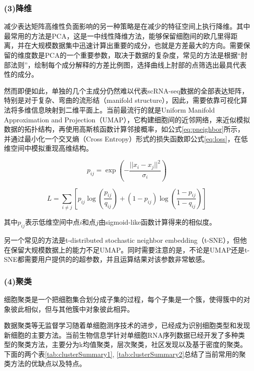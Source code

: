 \subsubsection{(3)降维}

减少表达矩阵高维性负面影响的另一种策略是在减少的特征空间上执行降维。其中最常用的方法是PCA，这是一中线性降维方法，能够保留细胞间的欧几里得距离，并在大规模数据集中迅速计算出重要的成分，也就是方差最大的方向。需要保留的维度数是PCA的一个重要参数，取决于数据的复杂度，常见的方法是根据“肘部法则”，绘制每个成分解释的方差比例图，选择曲线上肘部的点筛选出最具代表性的成分。

然而即便如此，单独的几个主成分仍然难以代表scRNA-seq数据的全部表达矩阵，特别是对于复杂、弯曲的流形结（manifold structure），因此，需要依靠可视化算法将多维信息映射到二维平面上。当前最流行的就是Uniform Manifold Approximation and Projection（UMAP），它构建细胞间的近邻网络，来近似模拟数据的拓扑结构，再使用高斯核函数计算邻接概率，如公式\ref{eq:pneighbor}所示，并通过最小化一个交叉熵（Cross Entropy）形式的损失函数即公式\ref{eq:loss}，在低维空间中模拟重现高维结构。

\begin{equation}
  \label{eq:pneighbor}
  p_{ij} = \exp\left(-\frac{||x_i - x_j||^2}{\sigma_i}\right)
\end{equation}

\begin{equation}
  \label{eq:loss}
  L = \sum_{i \ne j} \left[ p_{ij} \log \left( \frac{p_{ij}}{q_{ij}} \right) + (1 - p_{ij}) \log \left( \frac{1 - p_{ij}}{1 - q_{ij}} \right) \right]
\end{equation}

其中$p_{ij}$表示低维空间中点$i$和点$j$由sigmoid-like函数计算得来的相似度。

另一个常见的方法是t-distributed stochastic neighbor embedding（t-SNE），但他在保留大规模数据上的能力不足UMAP。同时需要注意的是，不论是UMAP还是t-SNE都需要用户提供的的超参数，并且运算结果对该参数非常敏感。

\subsubsection{(4)聚类}

细胞聚类是一个把细胞集合划分成子集的过程，每个子集是一个簇，使得簇中的对象彼此相似，但与其他簇中对象彼此相异。

数据聚类等无监督学习随着单细胞测序技术的进步，已经成为识别细胞类型和发现新细胞的主要方法。当前生物信息学针对单细胞RNA序列数据已经开发了多种类型的聚类方法，主要分为k均值聚类，层次聚类，社区发现以及基于密度的聚类。下面的两个表\ref{tab:clusterSummary1}, \ref{tab:clusterSummary2}总结了当前常用的聚类方法的优缺点以及特点。



